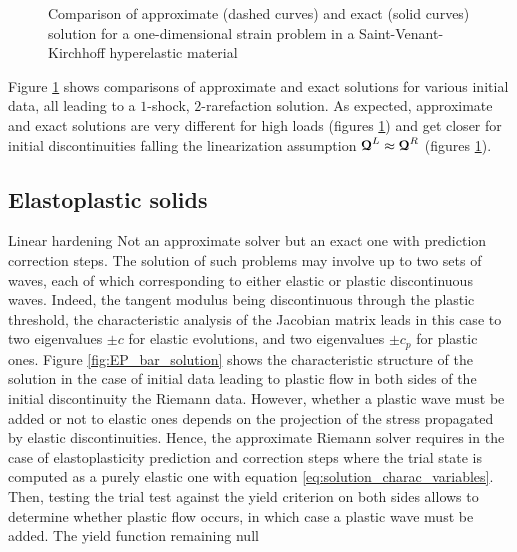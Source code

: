\begin{figure}[h!]
  \centering
  {  \label{subfig:SVK_Approx1}}
  {  \label{subfig:SVK_Approx4}}
  \caption{Comparison of approximate (dashed curves) and exact (solid curves) solution for a one-dimensional strain problem in a Saint-Venant-Kirchhoff hyperelastic material}
  \label{fig:comparison_exact_approx}
\end{figure}

Figure \ref{fig:comparison_exact_approx} shows comparisons of approximate and exact solutions for various initial data, all leading to a $1$-shock, $2$-rarefaction solution. As expected, approximate and exact solutions are very different for high loads (figures \ref{fig:comparison_exact_approx}) and get closer for initial discontinuities falling the linearization assumption ${\boldsymbol{\mathcal{Q}}}^L\approx {\boldsymbol{\mathcal{Q}}}^R$ (figures \ref{fig:comparison_exact_approx}).
\subsection{Elastoplastic solids}
Linear hardening
Not an approximate solver but an exact one with prediction correction steps.
The solution of such problems may involve up to two sets of waves, each of which corresponding to either elastic or plastic discontinuous waves. Indeed, the tangent modulus being discontinuous through the plastic threshold, the characteristic analysis of the Jacobian matrix leads in this case to two eigenvalues $\pm c$ for elastic evolutions, and two eigenvalues $\pm c_p$ for plastic ones. Figure \ref{fig:EP_bar_solution} shows the characteristic structure of the solution in the case of initial data leading to plastic flow in both sides of the initial discontinuity the Riemann data. However, whether a plastic wave must be added or not to elastic ones depends on the projection of the stress propagated by elastic discontinuities. Hence, the approximate Riemann solver requires in the case of elastoplasticity prediction and correction steps where the trial state is computed as a purely elastic one with equation \eqref{eq:solution_charac_variables}. Then, testing the trial test against the yield criterion on both sides allows to determine whether plastic flow occurs, in which case a plastic wave must be added. The yield function remaining null 

